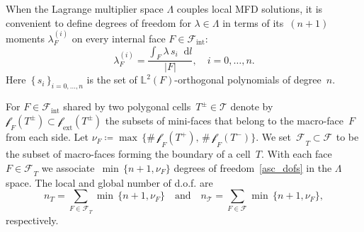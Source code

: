\documentclass[12pt]{article}
\newcommand{\svginputw}[2][\linewidth]{\def\svgwidth{#1}} %
\newcommand{\vect}[1]{\boldsymbol{\mathbf{#1}}}
\newcommand{\bcell}{T}
\newcommand{\bmesh}{{\vect{\mathcal T}}}
\newcommand{\mmesh}{{\vect{\mathcal \tau}}}
\newcommand{\bface}{F}
\newcommand{\bfaces}[1][]{{\vect{\mathcal F}_{\text{#1}}}}
\newcommand{\mfaces}[1][]{{\vect{\mathcal f}_{\text{#1}}}}
\newcommand{\LTwoSpace}[1][\Omega]{{\mathbb L^2\left({#1}\right)}}
\newcommand*\diff{\mathop{}\!\mathrm{d}}
\begin{document}
	
	When the Lagrange multiplier space $\Lambda$ couples local MFD solutions, it is convenient to define
	degrees of freedom for $\lambda\in\Lambda$ in terms of its~$(n+1)$ moments $\lambda^{(i)}_F$ on every internal face $F\in\bfaces[int]$:
	\begin{equation}\label{asc_dofs}
		\lambda^{(i)}_F=\frac{\int_F  \lambda\,s_i \diff l}{|F|}, \quad i = 0, \dots, n.
	\end{equation}
	Here~$\{\,s_i\,\}_{i=0,\dots,n}$ is the set of $\LTwoSpace[\bface]$-orthogonal polynomials of degree~$n$.
	
	For $F \in \bfaces[int]$ shared by two polygonal cells~$\bcell^\pm\in \bmesh$  denote by~$\mfaces_F(T^\pm) \subset \mfaces_{\text{ext}}(T^\pm)$ the subsets of mini-faces that belong to the macro-face~$F$ from each side. Let $\nu_F \coloneqq \max\,\{ \#\,\mfaces_F(T^+),\,\#\,\mfaces_F(T^-) \}$. We set~$\bfaces_\bcell \subset \bfaces$ to be the subset of macro-faces forming the boundary of a cell~$T$. With each face $F \in \bfaces_\bcell$ we associate~$\min\,\{ n+1, \nu_F \}$ degrees of freedom~\eqref{asc_dofs} in the $\Lambda$ space. The local and global number of d.o.f. are
	\[
		n_\bcell = \sum_{F \in \bfaces_\bcell} \min\,\{ n+1, \nu_F \} \quad\text{and}\quad
		n_\bmesh = \sum_{F \in \bfaces} \min\,\{ n+1, \nu_F \},
	\]
	respectively.
	
\end{document}
